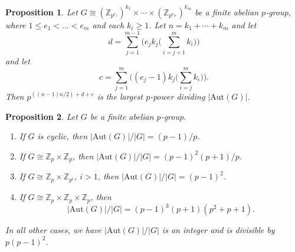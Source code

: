 \documentclass[10pt,a4paper]{amsart}
\newtheorem{proposition}{Proposition}
\begin{document}
\begin{proposition}\label{prop: dc}
Let $G \cong (\mathbb{Z}_{p^{e_1}})^{k_1} \times \cdots \times (\mathbb{Z}_{p^{e_m}})^{k_m}$ be a finite abelian $p$-group, where $1 \leq e_1 < \dots < e_m$ and each $k_i \geq 1$.  Let $n = k_1 + \cdots + k_m$ and let $$d = \sum_{j=1}^{m-1} \Big( e_j k_j \big(\sum_{i=j+1}^m k_i \big) \Big)$$ and let $$c = \sum_{j=1}^{m} \Big( (e_j-1)k_j\big(\sum_{i=j}^m k_i \big) \Big).$$  Then $p^{((n-1)n/2) + d + c}$ is the largest $p$-power dividing $|\mathrm{Aut}(G)|$.
\end{proposition}

\begin{proposition}\label{prop: class}
Let $G$ be a finite abelian $p$-group.  
\begin{enumerate}
\item If $G$ is cyclic, then $|\mathrm{Aut}(G)|/|G| = (p-1)/p$.
\item If $G \cong \mathbb{Z}_{p} \times \mathbb{Z}_{p}$, then $|\mathrm{Aut}(G)|/|G| = (p-1)^2(p+1)/p$.
\item If $G \cong \mathbb{Z}_{p} \times \mathbb{Z}_{p^i}$, $i > 1$, then $|\mathrm{Aut}(G)|/|G| = (p-1)^2$.
\item If $G \cong \mathbb{Z}_{p} \times \mathbb{Z}_{p} \times \mathbb{Z}_{p}$, then $$|\mathrm{Aut}(G)|/|G| =(p-1)^3(p+1)(p^2+p+1).$$
\end{enumerate}
In all other cases, we have $|\mathrm{Aut}(G)|/|G|$ is an integer and is divisible by $p(p-1)^2$.
\end{proposition}
\end{document}
